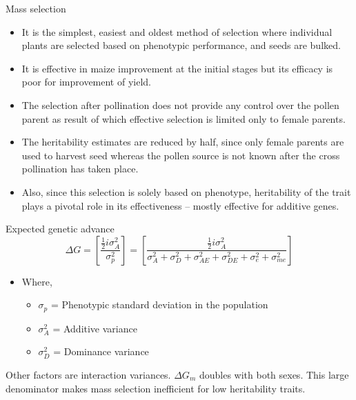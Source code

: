 \documentclass[11pt,ignorenonframetext,aspectratio=169]{beamer}
\providecommand{\tightlist}{%
  \setlength{\itemsep}{0pt}\setlength{\parskip}{0pt}}
\begin{document}
\begin{frame}{Mass selection}
\protect\hypertarget{mass-selection}{}
\begin{itemize}
\tightlist
\item
  It is the simplest, easiest and oldest method of selection where
  individual plants are selected based on phenotypic performance, and
  seeds are bulked.
\item
  It is effective in maize improvement at the initial stages but its
  efficacy is poor for improvement of yield.
\item
  The selection after pollination does not provide any control over the
  pollen parent as result of which effective selection is limited only
  to female parents.
\item
  The heritability estimates are reduced by half, since only female
  parents are used to harvest seed whereas the pollen source is not
  known after the cross pollination has taken place.
\item
  Also, since this selection is solely based on phenotype, heritability
  of the trait plays a pivotal role in its effectiveness -- mostly
  effective for additive genes.
\end{itemize}
\end{frame}

\begin{frame}{Expected genetic advance}
\protect\hypertarget{expected-genetic-advance}{}
\[
\Delta G = \left[ \frac{\frac{1}{2}i \sigma^2_A}{\sigma^2_p} \right] = \left[ \frac{\frac{1}{2}i \sigma^2_A}{\sigma^2_A + \sigma^2_D + \sigma^2_{AE} + \sigma^2_{DE} + \sigma^2_e + \sigma^2_{me}} \right]
\]

\begin{itemize}
\tightlist
\item
  Where,

  \begin{itemize}
  \tightlist
  \item
    \(\sigma_p\) = Phenotypic standard deviation in the population
  \item
    \(\sigma^2_A\) = Additive variance
  \item
    \(\sigma^2_D\) = Dominance variance
  \end{itemize}
\end{itemize}

Other factors are interaction variances. \(\Delta G_m\) doubles with
both sexes. This large denominator makes mass selection inefficient for
low heritability traits.
\end{frame}
\end{document}
